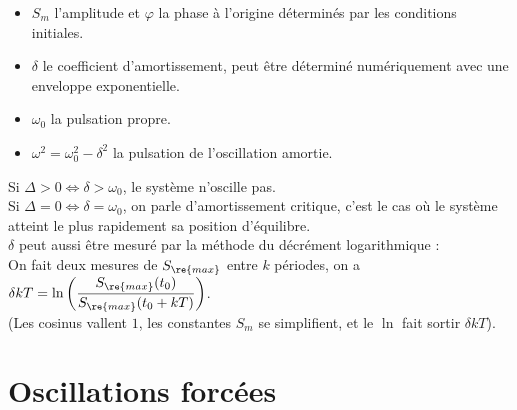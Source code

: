 \documentclass[13pt, twoside, a4paper, french]{report}
\begin{document}
        
        \begin{itemize}
            \item $S_m$ l'amplitude et $\varphi$ la phase à l'origine déterminés par les conditions initiales.
            \item $\delta$ le coefficient d'amortissement, peut être déterminé numériquement avec une enveloppe exponentielle.
            \item $\omega_0$ la pulsation propre.
            \item $\omega^2 = \omega_0^2 - \delta^2$ la pulsation de l'oscillation amortie.
        \end{itemize}
        \vspace{7pt}
        Si $\Delta > 0 \iff \delta > \omega_0$, le système n'oscille pas.\\
        Si $\Delta = 0 \iff \delta = \omega_0$, on parle d'amortissement critique, c'est le cas où le système atteint le plus rapidement sa position d'équilibre.\\
        
        $\delta$ peut aussi être mesuré par la méthode du décrément logarithmique :\\
        On fait deux mesures de $S_\re{max}$ entre $k$ périodes, on a $\delta k T = \ln\left(\dfrac{S_\re{max}(t_0)}{S_\re{max}(t_0 + kT)}\right)$.\\
        (Les cosinus vallent $1$, les constantes $S_m$ se simplifient, et le $\ln$ fait sortir $\delta k T$).
    
    
    \section{Oscillations forcées}
        
\end{document}
